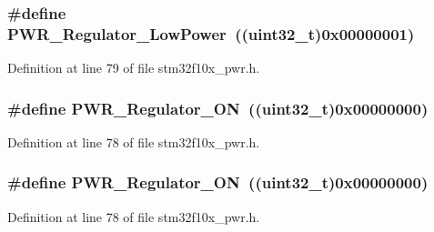 \subsubsection[{\texorpdfstring{P\+W\+R\+\_\+\+Regulator\+\_\+\+Low\+Power}{PWR_Regulator_LowPower}}]{\setlength{\rightskip}{0pt plus 5cm}\#define P\+W\+R\+\_\+\+Regulator\+\_\+\+Low\+Power~(({\bf uint32\+\_\+t})0x00000001)}\hypertarget{group___regulator__state__is___s_t_o_p__mode_ga13745136d094661358d373b67ebf1ac7}{}\label{group___regulator__state__is___s_t_o_p__mode_ga13745136d094661358d373b67ebf1ac7}


Definition at line 79 of file stm32f10x\+\_\+pwr.\+h.

\subsubsection[{\texorpdfstring{P\+W\+R\+\_\+\+Regulator\+\_\+\+ON}{PWR_Regulator_ON}}]{\setlength{\rightskip}{0pt plus 5cm}\#define P\+W\+R\+\_\+\+Regulator\+\_\+\+ON~(({\bf uint32\+\_\+t})0x00000000)}\hypertarget{group___regulator__state__is___s_t_o_p__mode_gabf58b999bff6b4bf0fb5b97d74a75683}{}\label{group___regulator__state__is___s_t_o_p__mode_gabf58b999bff6b4bf0fb5b97d74a75683}


Definition at line 78 of file stm32f10x\+\_\+pwr.\+h.

\subsubsection[{\texorpdfstring{P\+W\+R\+\_\+\+Regulator\+\_\+\+ON}{PWR_Regulator_ON}}]{\setlength{\rightskip}{0pt plus 5cm}\#define P\+W\+R\+\_\+\+Regulator\+\_\+\+ON~(({\bf uint32\+\_\+t})0x00000000)}\hypertarget{group___regulator__state__is___s_t_o_p__mode_gabf58b999bff6b4bf0fb5b97d74a75683}{}\label{group___regulator__state__is___s_t_o_p__mode_gabf58b999bff6b4bf0fb5b97d74a75683}


Definition at line 78 of file stm32f10x\+\_\+pwr.\+h.

